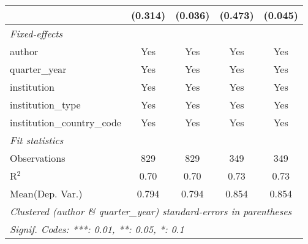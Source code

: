 \begin{tabular}{lcccc}
                                            & (0.314) & (0.036) & (0.473) & (0.045)\\   
   \midrule
   \emph{Fixed-effects}\\
   author                                   & Yes     & Yes     & Yes     & Yes\\  
   quarter\_year                            & Yes     & Yes     & Yes     & Yes\\  
   institution                              & Yes     & Yes     & Yes     & Yes\\  
   institution\_type                        & Yes     & Yes     & Yes     & Yes\\  
   institution\_country\_code               & Yes     & Yes     & Yes     & Yes\\  
   \midrule
   \emph{Fit statistics}\\
   Observations                             & 829     & 829     & 349     & 349\\  
   R$^2$                                    & 0.70    & 0.70    & 0.73    & 0.73\\  
Mean(Dep. Var.) & 0.794 & 0.794 & 0.854 & 0.854 \\
   \midrule \midrule
   \multicolumn{5}{l}{\emph{Clustered (author \& quarter\_year) standard-errors in parentheses}}\\
   \multicolumn{5}{l}{\emph{Signif. Codes: ***: 0.01, **: 0.05, *: 0.1}}\\
\end{tabular}
\par\endgroup
